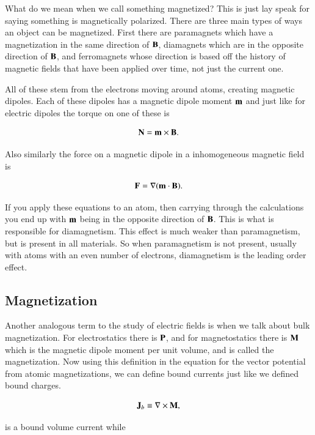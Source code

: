 \documentclass[preprint, review,12pt]{elsarticle}
\def\x{\times}
\def\.{\cdot}
\def\b{\textbf}
\def\={\equiv}
\begin{document}
What do we mean when we call something magnetized? This is just lay speak for saying something is magnetically polarized. There are three main types of ways an object can be magnetized. First there are paramagnets which have a magnetization in the same direction of $\b B$, diamagnets which are in the opposite direction of $\b B$, and ferromagnets whose direction is based off the history of magnetic fields that have been applied over time, not just the current one.

All of these stem from the electrons moving around atoms, creating magnetic dipoles. Each of these dipoles has a magnetic dipole moment $\b m$ and just like for electric dipoles the torque on one of these is

\begin{equation}
    \b N = \b m \x \b B.
\end{equation}

Also similarly the force on a magnetic dipole in a inhomogeneous magnetic field is

\begin{equation}
    \b F = \nabla (\b m \. \b B).
\end{equation}

If you apply these equations to an atom, then carrying through the calculations you end up with $\b m$ being in the opposite direction of $\b B$. This is what is responsible for diamagnetism. This effect is much weaker than paramagnetism, but is present in all materials. So when paramagnetism is not present, usually with atoms with an even number of electrons, diamagnetism is the leading order effect.

\subsection{Magnetization}

Another analogous term to the study of electric fields is when we talk about bulk magnetization. For electrostatics there is $\b P$, and for magnetostatics there is $\b M$ which is the magnetic dipole moment per unit volume, and is called the magnetization. Now using this definition in the equation for the vector potential from atomic magnetizations, we can define bound currents just like we defined bound charges. 

\begin{equation}
    \b J_b \= \nabla \x \b M,
\end{equation}

is a bound volume current while
\end{document}
